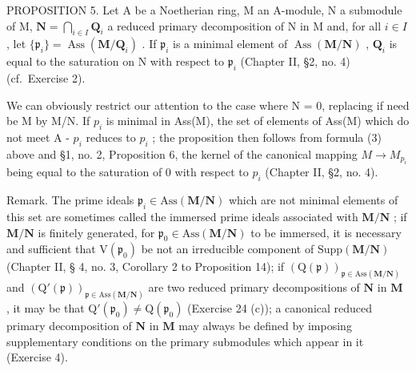 PROPOSITION 5. Let A be a Noetherian ring, M an A-module, N a submodule of M, \(\mathbf{N} = \bigcap_{i \in I} \mathbf{Q}_i\) a reduced primary decomposition of N in M and, for all \(i \in I\) , let \(\{\mathfrak{p}_i\} = \operatorname{Ass}(\mathbf{M} / \mathbf{Q}_i)\) . If \(\mathfrak{p}_i\) is a minimal element of \(\operatorname{Ass}(\mathbf{M} / \mathbf{N})\) , \(\mathbf{Q}_i\) is equal to the saturation on N with respect to \(\mathfrak{p}_i\) (Chapter II, §2, no. 4) (cf.~Exercise 2).

We can obviously restrict our attention to the case where N = 0, replacing if need be M by M/N. If \(p_{i}\) is minimal in Ass(M), the set of elements of Ass(M) which do not meet A - \(p_{i}\) reduces to \(p_{i}\) ; the proposition then follows from formula (3) above and §1, no. 2, Proposition 6, the kernel of the canonical mapping \(M \to M_{p_{i}}\) being equal to the saturation of 0 with respect to \(p_{i}\) (Chapter II, §2, no. 4).

Remark. The prime ideals \(\mathfrak{p}_i\in\mathrm{Ass}(\mathbf{M}/\mathbf{N})\) which are not minimal elements of this set are sometimes called the immersed prime ideals associated with \(\mathbf{M}/\mathbf{N}\) ; if \(\mathbf{M}/\mathbf{N}\) is finitely generated, for \(\mathfrak{p}_0\in\mathrm{Ass}(\mathbf{M}/\mathbf{N})\) to be immersed, it is necessary and sufficient that \(\mathrm{V}(\mathfrak{p}_0)\) be not an irreducible component of \(\mathrm{Supp}(\mathbf{M}/\mathbf{N})\) (Chapter II, § 4, no. 3, Corollary 2 to Proposition 14); if \((\mathrm{Q}(\mathfrak{p}))_{\mathfrak{p}\in\mathrm{Ass}(\mathbf{M}/\mathbf{N})}\) and \((\mathrm{Q}'(\mathfrak{p}))_{\mathfrak{p}\in\mathrm{Ass}(\mathbf{M}/\mathbf{N})}\) are two reduced primary decompositions of \(\mathbf{N}\) in \(\mathbf{M}\) , it may be that \(\mathrm{Q}'(\mathfrak{p}_0)\neq\mathrm{Q}(\mathfrak{p}_0)\) (Exercise 24 (c)); a canonical reduced primary decomposition of \(\mathbf{N}\) in \(\mathbf{M}\) may always be defined by imposing supplementary conditions on the primary submodules which appear in it (Exercise 4).

